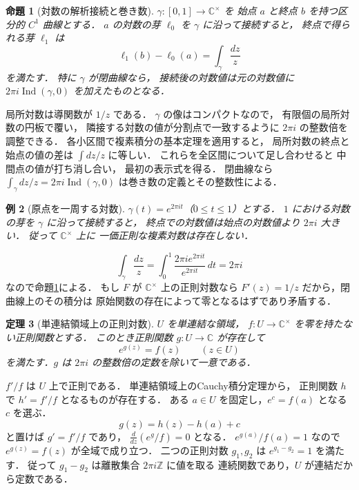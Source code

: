 \documentclass[a5paper,10pt,onecolumn]{jsarticle}
\makeatletter
\theoremstyle{mathnotetheorem}
\newtheorem{theorem}{定理}[section]
\newtheorem{proposition}[theorem]{命題}
\newtheorem{example}[theorem]{例}
\renewcommand{\proofname}{証明}
\renewenvironment{proof}[1][\proofname]{%
  \par\pushQED{\qed}\normalfont\topsep4\p@\@plus2\p@\relax
  \trivlist\item[\hskip\labelsep\bfseries #1]\ignorespaces
}{\popQED\endtrivlist\@endpefalse}
\makeatother
\begin{document}
\begin{proposition}[対数の解析接続と巻き数]\label{prop:log-winding}
$\gamma:[0,1]\to\mathbb C^\times$ を
始点 $a$ と終点 $b$ を持つ区分的 $C^1$ 曲線とする．
$a$ の対数の芽 $\ell_0$ を $\gamma$ に沿って接続すると，
終点で得られる芽 $\ell_1$ は
\[
 \ell_1(b)-\ell_0(a)=\int_\gamma\frac{dz}{z}
\]
を満たす．
特に $\gamma$ が閉曲線なら，
接続後の対数値は元の対数値に
$2\pi i\operatorname{Ind}(\gamma,0)$ を加えたものとなる．
\end{proposition}
\begin{proof}
局所対数は導関数が $1/z$ である．
$\gamma$ の像はコンパクトなので，
有限個の局所対数の円板で覆い，
隣接する対数の値が分割点で一致するように
$2\pi i$ の整数倍を調整できる．
各小区間で複素積分の基本定理を適用すると，
局所対数の終点と始点の値の差は
$\int dz/z$ に等しい．
これらを全区間について足し合わせると
中間点の値が打ち消し合い，
最初の表示式を得る．
閉曲線なら
$\int_\gamma dz/z=2\pi i\operatorname{Ind}(\gamma,0)$
は巻き数の定義とその整数性による．
\end{proof}

\begin{example}[原点を一周する対数]
$\gamma(t)=e^{2\pi it}$（$0\le t\le1$）とする．
$1$ における対数の芽を $\gamma$ に沿って接続すると，
終点での対数値は始点の対数値より $2\pi i$ 大きい．
従って $\mathbb C^\times$ 上に
一価正則な複素対数は存在しない．
\end{example}
\begin{proof}
\[
 \int_\gamma\frac{dz}{z}
 =\int_0^1\frac{2\pi ie^{2\pi it}}{e^{2\pi it}}\,dt
 =2\pi i
\]
なので命題\ref{prop:log-winding}による．
もし $F$ が $\mathbb C^\times$ 上の正則対数なら
$F'(z)=1/z$ だから，閉曲線上のその積分は
原始関数の存在によって零となるはずであり矛盾する．
\end{proof}

\begin{theorem}[単連結領域上の正則対数]\label{thm:global-log}
$U$ を単連結な領域，
$f:U\to\mathbb C^\times$ を零を持たない正則関数とする．
このとき正則関数 $g:U\to\mathbb C$ が存在して
\[
 e^{g(z)}=f(z)\qquad(z\in U)
\]
を満たす．$g$ は $2\pi i$ の整数倍の定数を除いて一意である．
\end{theorem}
\begin{proof}
$f'/f$ は $U$ 上で正則である．
単連結領域上のCauchy積分定理から，
正則関数 $h$ で $h'=f'/f$ となるものが存在する．
ある $a\in U$ を固定し，$e^c=f(a)$ となる $c$ を選ぶ．
\[
 g(z)=h(z)-h(a)+c
\]
と置けば $g'=f'/f$ であり，
$\frac d{dz}(e^g/f)=0$ となる．
$e^{g(a)}/f(a)=1$ なので
$e^{g(z)}=f(z)$ が全域で成り立つ．
二つの正則対数 $g_1,g_2$ は
$e^{g_1-g_2}=1$ を満たす．
従って $g_1-g_2$ は離散集合 $2\pi i\mathbb Z$ に値を取る
連続関数であり，$U$ が連結だから定数である．
\end{proof}
\end{document}
